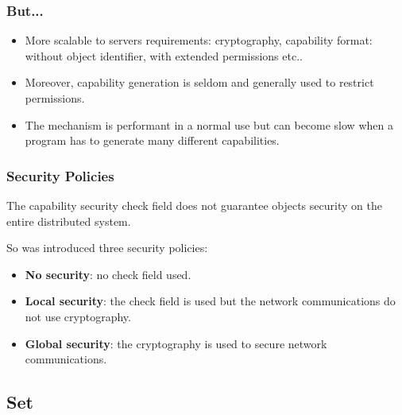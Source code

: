 
\begin{frame}
  \frametitle{But...}

  \begin{itemize}[<+->]
    \item
      More scalable to servers requirements: cryptography,
      capability format: without object identifier, with extended
      permissions etc..
    \item
      Moreover, capability generation is seldom and generally used
      to restrict permissions.
    \item
      The mechanism is performant in a normal use but can become
      slow when a program has to generate many different capabilities.
  \end{itemize}
\end{frame}


\begin{frame}
  \frametitle{Security Policies}

  The capability security check field does not guarantee objects security on
  the entire distributed system.

  \nl

  So was introduced three security policies:

  \begin{itemize}[<+->]
    \item
      \textbf{No security}: no check field used.
    \item
      \textbf{Local security}: the check field is used but the
      network communications do not use cryptography.
    \item
      \textbf{Global security}: the cryptography is used to secure
      network communications.
  \end{itemize}
\end{frame}

%
%

\subsection{Set}



